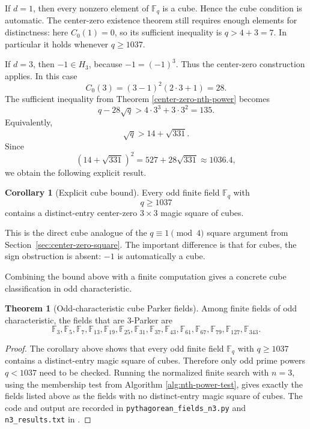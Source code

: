 \documentclass{article}
\newcommand{\F}{\mathbb F}
\theoremstyle{definition}
\newtheorem{theorem}{Theorem}
\newtheorem{corollary}{Corollary}
\numberwithin{equation}{section}
\begin{document}
If \(d=1\), then every nonzero element of \(\F_q\) is a cube.  Hence the cube
condition is automatic. The center-zero existence theorem still requires
enough elements for distinctness: here \(C_0(1)=0\), so its sufficient
inequality is \(q>4+3=7\). In particular it holds whenever \(q\geq1037\).

If \(d=3\), then \(-1\in H_3\), because \(-1=(-1)^3\).  Thus the center-zero
construction applies.  In this case
\[
C_0(3)=(3-1)^2(2\cdot 3+1)=28.
\]
The sufficient inequality from Theorem \ref{center-zero-nth-power} becomes
\[
q-28\sqrt q>4\cdot 3^3+3\cdot 3^2=135.
\]
Equivalently,
\[
\sqrt q>14+\sqrt{331}.
\]
Since
\[
(14+\sqrt{331})^2=527+28\sqrt{331}\approx 1036.4,
\]
we obtain the following explicit result.

\begin{corollary}[Explicit cube bound]
Every odd finite field \(\F_q\) with
\[
q\geq 1037
\]
contains a distinct-entry center-zero \(3\times 3\) magic square of cubes.
\end{corollary}

This is the direct cube analogue of the \(q\equiv1\pmod4\) square argument from
Section~\ref{sec:center-zero-square}.  The important difference is that for cubes, the sign obstruction is
absent: \(-1\) is automatically a cube.

Combining the bound above with a finite computation gives a concrete cube
classification in odd characteristic.

\begin{theorem}[Odd-characteristic cube Parker fields]
Among finite fields of odd characteristic, the fields that are \(3\)-Parker are
\[
\F_3,
\F_5,
\F_7,
\F_{13},
\F_{19},
\F_{25},
\F_{31},
\F_{37},
\F_{43},
\F_{61},
\F_{67},
\F_{79},
\F_{127},
\F_{343}.
\]
\end{theorem}

\begin{proof}
The corollary above shows that every odd finite field \(\F_q\) with
\(q\geq1037\) contains a distinct-entry magic square of cubes.  Therefore only
odd prime powers \(q<1037\) need to be checked.  Running the normalized finite
search with \(n=3\), using the membership test from Algorithm
\ref{alg:nth-power-test}, gives exactly the fields listed above as the fields
with no distinct-entry magic square of cubes.  The code and output are recorded
in \texttt{pythagorean\_fields\_n3.py} and \texttt{n3\_results.txt} in
\cite{magicSquaresFieldsRepo}.
\end{proof}
\end{document}
